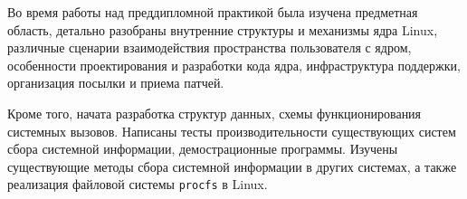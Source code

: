 \label{sec:outro}

Во время работы над преддипломной практикой была изучена предметная область,
детально разобраны внутренние структуры и механизмы ядра Linux, различные
сценарии взаимодействия пространства пользователя с ядром, особенности
проектирования и разработки кода ядра, инфраструктура поддержки, организация
посылки и приема патчей.

Кроме того, начата разработка структур данных, схемы функционирования системных
вызовов. Написаны тесты производительности существующих систем сбора системной
информации, демострационные программы. Изучены существующие методы сбора
системной информации в других системах, а также реализация файловой системы
\texttt{procfs} в Linux.
